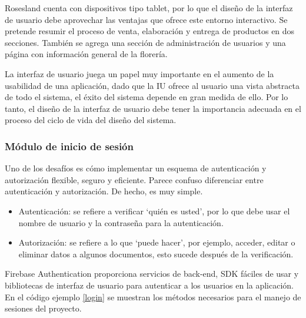 Rosesland cuenta con dispositivos tipo tablet, por lo que el diseño de la interfaz de usuario debe aprovechar las ventajas que ofrece este entorno interactivo. Se pretende resumir el proceso de venta, elaboración y entrega de productos en dos secciones. También se agrega una sección de administración de usuarios y una página con información general de la florería.
\vspace{0.8cm}

La interfaz de usuario juega un papel muy importante en el aumento de la usabilidad de una aplicación, dado que la IU ofrece al usuario una vista abstracta de todo el sistema, el éxito del sistema depende en gran medida de ello. Por lo tanto, el diseño de la interfaz de usuario debe tener la importancia adecuada en el proceso del ciclo de vida del diseño del sistema.
\vspace{0.8cm}

\subsubsection{Módulo de inicio de sesión}
Uno de los desafíos es cómo implementar un esquema de autenticación y autorización flexible, seguro y eficiente. Parece confuso diferenciar entre autenticación y autorización. De hecho, es muy simple.

\begin{itemize}
  \item Autenticación: se refiere a verificar `quién es usted', por lo que debe usar el nombre de usuario y la contraseña para la autenticación.

  \item Autorización: se refiere a lo que `puede hacer', por ejemplo, acceder, editar o eliminar datos a algunos documentos, esto sucede después de la verificación.
\end{itemize}

Firebase Authentication proporciona servicios de back-end, SDK fáciles de usar y bibliotecas de interfaz de usuario para autenticar a los usuarios en la aplicación. En el código ejemplo \ref{login} se muestran los métodos necesarios para el manejo de sesiones del proyecto.
\vspace{0.8cm}

